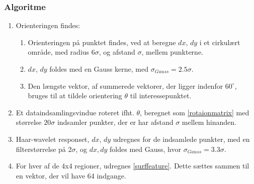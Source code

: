 \subsubsection*{Algoritme}
\begin{enumerate}
\item Orienteringen findes: 
\begin{enumerate}
	\item Orienteringen på punktet findes, ved at beregne $dx$, $dy$ i et cirkulært område, med radius $6\sigma$, og afstand $\sigma$, mellem punkterne. 
	\item $dx$, $dy$ foldes med en Gauss kerne, med $\sigma_{Gauss} = 2.5\sigma $.
	\item Den længste vektor, af summerede vektorer, der ligger indenfor $60^{\circ}$, bruges til at tildele orientering $\theta$ til interessepunktet.
\end{enumerate}
\item Et dataindsamlingsvindue roteret ifht. $\theta$, beregnet som \eqref{rotaionmatrix} med størrelse $20\sigma$ indsamler punkter, der er har afstand $\sigma$ mellem hinanden.
\item Haar-wavelet responset, $dx$, $dy$ udregnes for de indsamlede punkter, med en filterstørrelse på $2\sigma$, og $dx, dy$ foldes med Gauss, hvor $\sigma_{Gauss} = 3.3\sigma$.
\item For hver af de 4x4 regioner, udregnes \eqref{surffeature}. Dette sættes sammen til en vektor, der vil have 64 indgange.
\end{enumerate}